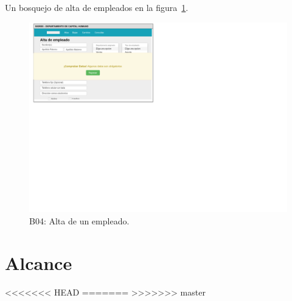 Un bosquejo de alta de empleados en la figura~\ref{fig:b4}. 
\begin{figure}[H]
    \centering
    \includegraphics[scale=.4]{iu/mockup4.png}
    \centering
    \caption{B04: Alta de un empleado.}
    \label{fig:b4}
\end{figure}

\section{Alcance}


<<<<<<< HEAD
=======
>>>>>>> master
